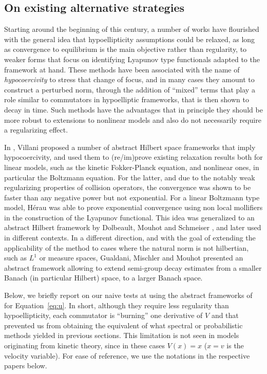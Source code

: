 \documentclass[12pt]{article}
\begin{document}
\subsection{On existing alternative strategies}
Starting around the beginning of this century, a number of works have flourished 
with the general idea that hypoellipticity assumptions could be relaxed, as long 
as convergence to equilibrium is the main objective rather than regularity, to 
weaker forms that focus on identifying Lyapunov type functionals adapted to the 
framework at hand.  These methods have been associated with the name of 
{\it hypocoercivity} to stress that change of focus, and in many cases they 
amount to construct a perturbed norm, through the addition of ``mixed'' terms 
that play a role similar to commutators in hypoelliptic frameworks, that is then 
shown to decay in time. Such methods  have the advantages that in principle they 
should be more robust to extensions to nonlinear models and also do not 
necessarily require a  regularizing effect.

In \cite{Vil09}, Villani proposed a number of abstract Hilbert space frameworks 
that imply hypocoercivity, and used them to (re/im)prove existing relaxation 
results both for linear models, such as the kinetic Fokker-Planck equation, 
and nonlinear ones, in particular the Boltzmann equation. For the latter, and 
due to the notably weak regularizing properties of collision operators, the 
convergence was shown to be faster than any negative power but not exponential. 
For a linear Boltzmann type model, Hérau \cite{Her06} was able to prove 
exponential convergence using non local mollifiers in the construction of the 
Lyapunov functional. This idea was generalized to an abstract Hilbert framework 
by Dolbeault, Mouhot and Schmeiser \cite{DolMouSch15}, and later used in different 
contexts. In a different direction, and with the goal of extending the 
applicability of the method to cases where the natural norm is not hilbertian, 
such as $L^1$ or measure spaces, Gualdani, Mischler and Mouhot \cite{GuaMisMou17} 
presented an abstract framework allowing to extend semi-group decay estimates 
from a smaller Banach (in particular Hilbert) space, to a larger Banach space. 

\smallskip

Below, we briefly report on our naive tests at using the abstract frameworks 
of \cite{Vil09, DolMouSch15, GuaMisMou17} for Equation~\eqref{eq:u}. In short, 
although they require less regularity than hypoellipticity, each commutator 
is ``burning'' one derivative of $V$ and that prevented us from obtaining 
the equivalent of what spectral or probabilistic methods yielded in previous 
sections. This limitation is not seen in models originating from kinetic theory, 
since in these cases $V(x)=x$ ($x=v$ is the velocity variable). For ease of 
reference, we use the notations in the respective papers below.  
\end{document}
